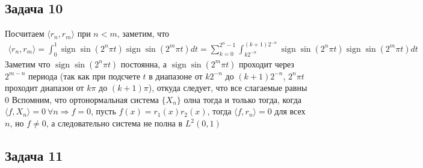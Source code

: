 \subsection*{Задача 10}
	Посчитаем $\langle r_n, r_m \rangle$ при $n < m$, заметим, что 
	\begin{gather*}
		\langle r_n, r_m \rangle 
		= \int_{0}^{1} \operatorname{sign} \sin (2^n \pi t) \operatorname{sign} \sin (2^m \pi t) dt
		= \sum\limits_{k = 0}^{2^n - 1} \int_{k2^{-n}}^{(k+1)2^{-n}} \operatorname{sign} \sin (2^n \pi t)\operatorname{sign} \sin (2^m \pi t) dt
	\end{gather*}
	Заметим что $\operatorname{sign} \sin (2^n \pi t)$ постоянна, а $\operatorname{sign} \sin (2^m \pi t)$ проходит через $2^{m-n}$ периода (так как при подсчете $t$ в диапазоне от $k2^{-n}$ до $(k+1)2^{-n}$, $2^n \pi t$ проходит диапазон от $k \pi$ до $(k+1)\pi$), откуда следует, что все слагаемые равны $0$
	\vskip 0.1in
	Вспомним, что ортонормальная система $\{X_n\}$ олна тогда и только тогда, когда $\langle f, X_n \rangle = 0\ \forall n \Rightarrow f = 0$, пусть $f(x) = r_1(x)r_2(x)$, тогда $\langle f, r_n \rangle = 0$ для всех $n$, но $f \ne 0$, а следовательно система не полна в $L^2(0,1)$
\vskip 0.4in

\subsection*{Задача 11}

\vskip 0.4in

